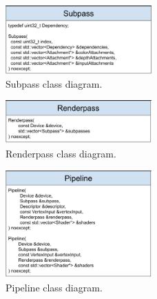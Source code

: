 \documentclass[12pt]{report}
\newcommand{\figurewidth}{0.6\textwidth}
\newcommand{\imagewidth}{0.5\textwidth}
\theoremstyle{definition}
\begin{document}
  \begin{figure}
    \centering
    \includegraphics[width=\imagewidth]{images/class_subpass.png}
    \caption{Subpass class diagram.}
    \label{fig:class_subpass}
  \end{figure}

  \begin{figure}
    \centering
    \includegraphics[width=\imagewidth]{images/class_renderpass.png}
    \caption{Renderpass class diagram.}
    \label{fig:class_renderpass}
  \end{figure}

  \begin{figure}
    \centering
    \includegraphics[width=\imagewidth]{images/class_pipeline.png}
    \caption{Pipeline class diagram.}
    \label{fig:class_pipeline}
  \end{figure}
\end{document}

